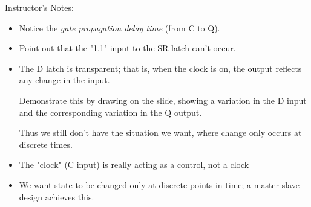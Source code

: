 \BNotes\ifnum{}
\begin{frame}[fragile]
Instructor's Notes:
\begin{itemize}
\item Notice the {\it gate propagation delay time} (from C to Q).
\item Point out that the "1,1" input to the SR-latch can't occur.
\item 
The D latch is transparent; that is, when the clock is on, the output
reflects any change in the input. 

Demonstrate this by drawing on the
slide, showing a variation in the D input and the corresponding
variation in the Q output. 

Thus we still don't have the situation we
want, where change only occurs at discrete times.
\item The "clock" (C input) is really acting as a control, not a clock
\end{itemize}
\end{frame}
\fi\ENotes

\begin{frame}[fragile]
\begin{itemize}
\item We want state to be changed only at discrete points in time; a
master-slave design achieves this.

\end{itemize}
\end{frame}

\newpage

